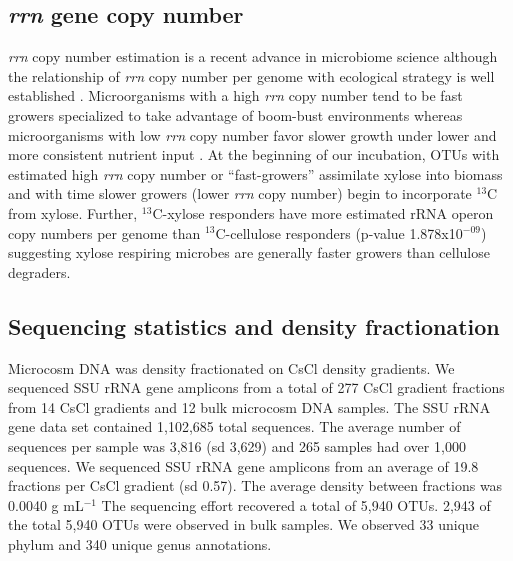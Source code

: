 \subsection{\textit{rrn} gene copy number}  
\textit{rrn} copy number estimation is a recent advance in microbiome
science \citep{Kembel_2012} although the relationship of \textit{rrn} copy
number per genome with ecological strategy is well established
\citep{Klappenbach_2000}. Microorganisms with a high \textit{rrn} copy
number tend to be fast growers specialized to take advantage of boom-bust
environments whereas microorganisms with low \textit{rrn} copy number
favor slower growth under lower and more consistent nutrient input
\citep{Klappenbach_2000}. At the beginning of our incubation, OTUs with
estimated high \textit{rrn} copy number or ``fast-growers'' assimilate
xylose into biomass and with time slower growers (lower \textit{rrn} copy
number) begin to incorporate $^{13}$C from xylose.  Further,
$^{13}$C-xylose responders have more estimated rRNA operon copy numbers
per genome than $^{13}$C-cellulose responders (p-value
1.878x10$^{-09}$) suggesting xylose respiring microbes are generally
faster growers than cellulose degraders.

\subsection{Sequencing statistics and density fractionation}
Microcosm DNA was density fractionated on CsCl density gradients. We sequenced
SSU rRNA gene amplicons from a total of 277 CsCl gradient fractions from 14
CsCl gradients and 12 bulk microcosm DNA samples. The SSU rRNA gene data set
contained 1,102,685 total sequences. The average number of sequences per sample
was 3,816 (sd 3,629) and 265 samples had over 1,000 sequences. We sequenced SSU
rRNA gene amplicons from an average of
19.8 fractions per CsCl gradient (sd 0.57). The average density between
fractions was  0.0040 g mL$^{-1}$ The sequencing effort recovered a total of
5,940 OTUs. 2,943 of the total 5,940 OTUs were observed in bulk samples. We
observed 33 unique phylum and 340 unique genus annotations.


